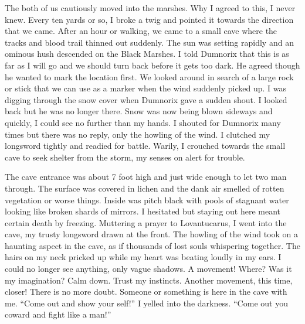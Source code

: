 The both of us cautiously moved into the marshes. Why I agreed to
this, I never knew. Every ten yards or so, I broke a twig and
pointed it towards the direction that we came. After an hour or
walking, we came to a small cave where the tracks and blood trail
thinned out suddenly. The sun was setting rapidly and an ominous
hush descended on the Black Marshes. I told Dumnorix that this is
as far as I will go and we should turn back before it gets too
dark. He agreed though he wanted to mark the location first. We
looked around in search of a large rock or stick that we can use as
a marker when the wind suddenly picked up. I was digging through
the snow cover when Dumnorix gave a sudden shout. I looked back but
he was no longer there. Snow was now being blown sideways and
quickly, I could see no further than my hands. I shouted for
Dumnorix many times but there was no reply, only the howling of the
wind. I clutched my longsword tightly and readied for battle.
Warily, I crouched towards the small cave to seek shelter from the
storm, my senses on alert for trouble.



The cave entrance was about 7 foot high and just wide enough to let
two man through. The surface was covered in lichen and the dank air
smelled of rotten vegetation or worse things. Inside was pitch
black with pools of stagnant water looking like broken shards of
mirrors. I hesitated but staying out here meant certain death by
freezing. Muttering a prayer to Lovantucarus, I went into the cave,
my trusty longsword drawn at the front. The howling of the wind
took on a haunting aspect in the cave, as if thousands of lost
souls whispering together. The hairs on my neck pricked up while my
heart was beating loudly in my ears. I could no longer see
anything, only vague shadows. A movement! Where? Was it my
imagination? Calm down. Trust my instincts. Another movement, this
time, closer! There is no more doubt. Someone or something is here
in the cave with me. ``Come out and show your self!'' I
yelled into the darkness. ``Come out you coward and fight like
a man!''



